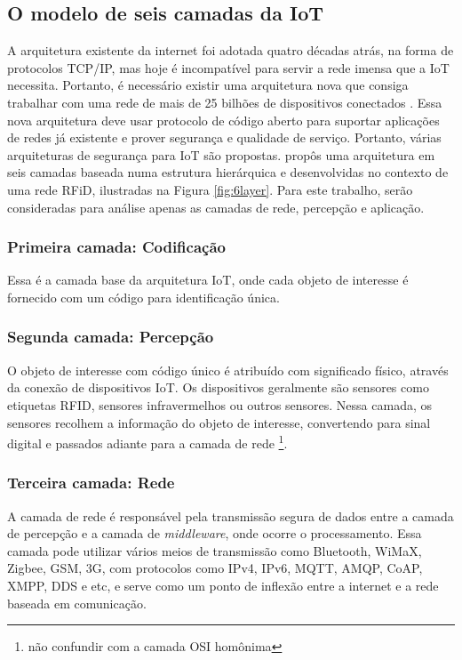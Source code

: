 \documentclass[tcc,capa]{texufpel}
\begin{document}
\subsection{O modelo de seis camadas da IoT}

A arquitetura existente da internet foi adotada quatro décadas atrás, na forma de protocolos TCP/IP, mas hoje é incompatível para servir a rede imensa que a IoT necessita. Portanto, é necessário existir uma arquitetura nova que consiga trabalhar com uma rede de mais de 25 bilhões de dispositivos conectados \cite{Sharma2019}. Essa nova arquitetura deve usar protocolo de código aberto para suportar aplicações de redes já existente e prover segurança e qualidade de serviço. Portanto, várias arquiteturas de segurança para IoT são propostas. \citet{xu} propôs uma arquitetura em seis camadas baseada numa estrutura hierárquica e desenvolvidas no contexto de uma rede RFiD, ilustradas na Figura \ref{fig:6layer}. Para este trabalho, serão consideradas para análise apenas as camadas de rede, percepção e aplicação. 

\subsubsection{Primeira camada: Codificação}
    Essa é a camada base da arquitetura IoT, onde cada objeto de interesse é fornecido com um código para identificação única.

\subsubsection{Segunda camada: Percepção}
    O objeto de interesse com código único é atribuído com significado físico, através da conexão de dispositivos IoT. Os dispositivos geralmente são sensores como etiquetas RFID, sensores infravermelhos ou outros sensores. Nessa camada, os sensores recolhem a informação do objeto de interesse, convertendo para sinal digital e passados adiante para a camada de rede \footnote{não confundir com a camada OSI homônima}.

\subsubsection{Terceira camada: Rede}
    A camada de rede é responsável pela transmissão segura de dados entre a camada de percepção e a camada de \textit{middleware}, onde ocorre o processamento. Essa camada pode utilizar vários meios de transmissão como Bluetooth, WiMaX, Zigbee, GSM, 3G, com protocolos como IPv4, IPv6, MQTT, AMQP, CoAP, XMPP, DDS e etc, e serve como um ponto de inflexão entre a internet e a rede baseada em comunicação.
\end{document}
